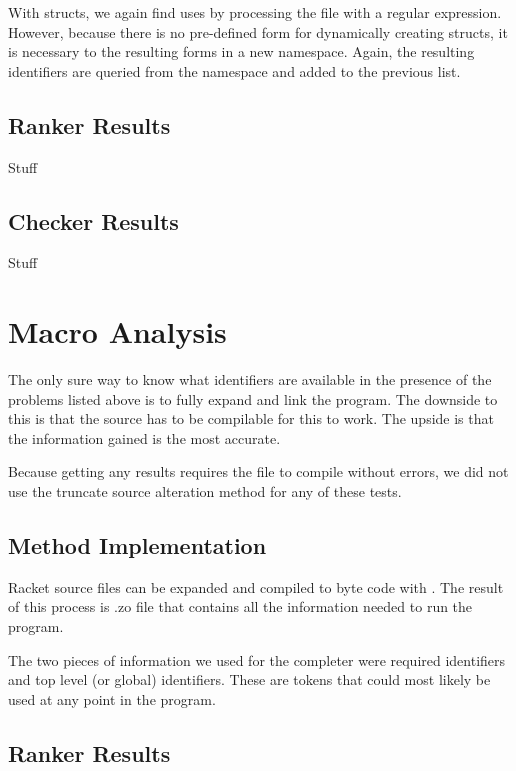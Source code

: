 \documentclass[ms,electronic,twosidetoc,letterpaper,chaptercenter,parttop,lol,lof,lot]{byumsphd}
\begin{document}
With structs, we again find uses by processing the file with a regular expression. However, because there is no pre-defined form for dynamically creating structs, it is necessary to  the resulting forms in a new namespace. Again, the resulting identifiers are queried from the namespace and added to the previous list.

\subsection{Ranker Results}

Stuff

\subsection{Checker Results}

Stuff

\section{Macro Analysis}

The only sure way to know what identifiers are available in the presence of the problems listed above is to fully expand and link the program. The downside to this is that the source has to be compilable for this to work. The upside is that the information gained is the most accurate.

Because getting any results requires the file to compile without errors, we did not use the truncate source alteration method for any of these tests.

\subsection{Method Implementation}

Racket source files can be expanded and compiled to byte code with . The result of this process is .zo file that contains all the information needed to run the program.

The two pieces of information we used for the completer were required identifiers and top level (or global) identifiers. These are tokens that could most likely be used at any point in the program.

\subsection{Ranker Results}
\end{document}
